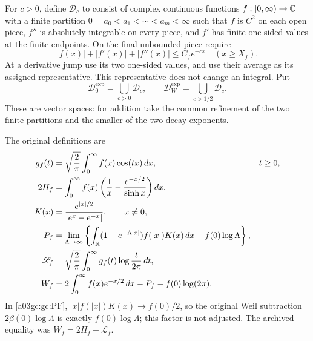 \documentclass[11pt,a4paper]{article}
\begin{document}
For $c>0$, define $\mathcal D_c$ to consist of complex continuous functions
$f:[0,\infty)\to\mathbb C$ with a finite partition
$0=a_0<a_1<\cdots<a_m<\infty$ such that $f$ is $C^2$ on each open piece,
$f''$ is absolutely integrable on every piece, and $f'$ has finite
one-sided values at the finite endpoints.  On the final unbounded piece
require
\begin{equation}
 |f(x)|+|f'(x)|+|f''(x)|\le C_f e^{-cx}
 \quad (x\ge X_f).
 \label{a03gc:gc:decay}
\end{equation}
At a derivative jump use its two one-sided values, and use their average
as its assigned representative.  This representative does not change an
integral.  Put
\begin{equation}
 \mathcal D_0^{\exp}=\bigcup_{c>0}\mathcal D_c,
 \qquad \mathcal D_W^{\exp}=\bigcup_{c>1/2}\mathcal D_c.
 \label{a03gc:gc:domains}
\end{equation}
These are vector spaces: for addition take the common refinement of the
two finite partitions and the smaller of the two decay exponents.

The original definitions are
\begin{align}
 g_f(t)&=\sqrt{\frac2\pi}\int_0^\infty f(x)\cos(tx)\,dx,
 &&t\ge0,\label{a03gc:gc:cosine}\\
 2H_f&=\int_0^\infty f(x)
       \left(\frac1x-\frac{e^{-x/2}}{\sinh x}\right)dx,
 \label{a03gc:gc:H}\\
 K(x)&=\frac{e^{|x|/2}}{|e^x-e^{-x}|},\qquad x\ne0,
 \label{a03gc:gc:K}\\
 P_f&=\lim_{\Lambda\to\infty}
 \left\{\int_\mathbb R(1-e^{-\Lambda|x|})f(|x|)K(x)\,dx
              -f(0)\log\Lambda\right\},
 \label{a03gc:gc:PF}\\
 \mathscr L_f&=\sqrt{\frac2\pi}\int_0^\infty
             g_f(t)\log\frac{t}{2\pi}\,dt,
 \label{a03gc:gc:L}\\
 W_f&=2\int_0^\infty f(x)e^{-x/2}\,dx-P_f-f(0)\log(2\pi).
 \label{a03gc:gc:W}
\end{align}
In \eqref{a03gc:gc:PF}, $|x|f(|x|)K(x)\to f(0)/2$, so the original
Weil subtraction $2\beta(0)\log\Lambda$ is exactly
$f(0)\log\Lambda$; this factor is not adjusted.
The archived equality was $W_f=2H_f+\mathscr L_f$.
\end{document}
